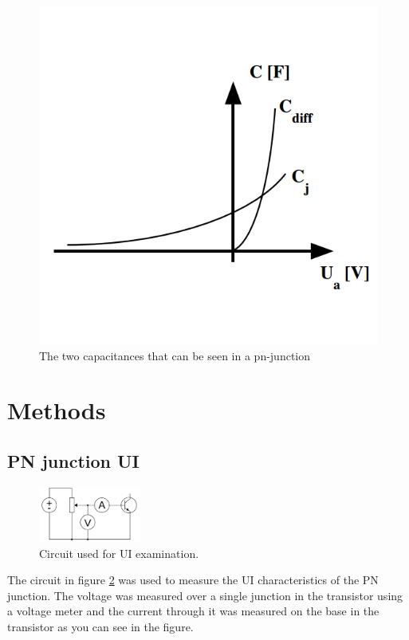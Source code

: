 \documentclass[a4paper]{article}
\begin{document}
\begin{figure}[H]
\centering
\includegraphics[scale=0.3]{capp.png}
\caption{The two capacitances that can be seen in a pn-junction}
\label{capp}
\end{figure}

\section{Methods}
\subsection{PN junction UI}
\begin{figure}[H]
	\centering
	\includegraphics[width=0.3\textwidth]{ui_koppling.png}
	\caption{Circuit used for UI examination.}
	\label{ui_koppling}
\end{figure}
The circuit in figure \ref{ui_koppling} was used to measure the UI characteristics of the PN junction. The voltage was measured over a single junction in the transistor using a voltage meter and the current through it was measured on the base in the transistor as you can see in the figure.
\end{document}
